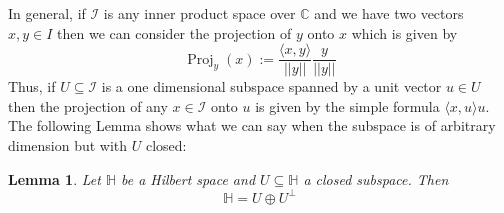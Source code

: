 \documentclass[12pt]{article}
\theoremstyle{plain}
\newtheorem{lemma}[thm]{Lemma}
\theoremstyle{definition}
\newcommand{\bb}[1]{\mathbb{#1}}
\newcommand{\call}[1]{\mathcal{#1}}
\begin{document}
In general, if $\call{I}$ is any inner product space over $\bb{C}$ and we have two vectors $x,y \in I$ then we can consider the projection of $y$ onto $x$ which is given by
\begin{equation}\label{eq:easy_case}
    \operatorname{Proj}_y(x) := \frac{\langle x, y \rangle}{||y||} \frac{y}{||y||}
\end{equation}
Thus, if $U \subseteq \call{I}$ is a one dimensional subspace spanned by a unit vector $u \in U$ then the projection of any $x \in \call{I}$ onto $u$ is given by the simple formula $\langle x,u\rangle u$. The following Lemma shows what we can say when the subspace is of arbitrary dimension but with $U$ closed:
\begin{lemma}\label{lem:decomposition}
Let $\bb{H}$ be a Hilbert space and $U \subseteq \bb{H}$ a closed subspace. Then
\[\bb{H} = U \oplus U^\perp\]
\end{lemma}
\end{document}
